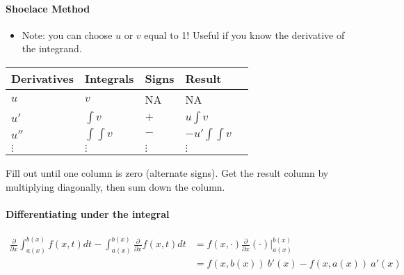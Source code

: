 \hypertarget{shoelace-method}{%
\paragraph{Shoelace Method}\label{shoelace-method}}

\begin{itemize}
\tightlist
\item
  Note: you can choose \(u\) or \(v\) equal to 1! Useful if you know the
  derivative of the integrand.
\end{itemize}

\begin{longtable}[]{@{}lllll@{}}
\toprule
Derivatives & Integrals & Signs & Result &\tabularnewline
\midrule
\endhead
\(u\) & \(v\) & NA & NA &\tabularnewline
\(u'\) & \(\int v\) & \(+\) & \(u\int v\) &\tabularnewline
\(u''\) & \(\int\int v\) & \(-\) & \(-u'\int\int v\) &\tabularnewline
\(\vdots\) & \(\vdots\) & \(\vdots\) & \(\vdots\) &\tabularnewline
\bottomrule
\end{longtable}

Fill out until one column is zero (alternate signs). Get the result
column by multiplying diagonally, then sum down the column.

\hypertarget{differentiating-under-the-integral}{%
\paragraph{Differentiating under the
integral}\label{differentiating-under-the-integral}}

\begin{align*}
\frac{\partial}{\partial x} \int_{a(x)}^{b(x)} f(x, t) dt - \int_{a(x)}^{b(x)} \frac{\partial}{\partial x} f(x, t) dt 
&= f(x, \cdot)\frac{\partial}{\partial x}(\cdot) \bigg\rvert_{a(x)}^{b(x)} \\
&= f(x, b(x))~b'(x) - f(x, a(x))~a'(x)
\end{align*}

